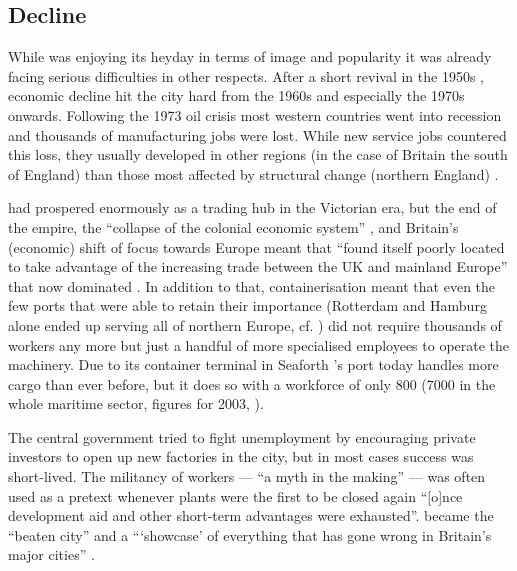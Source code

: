 		\subsection{Decline}\label{sec.hist.20.decline}

While  was enjoying its heyday in terms of image and popularity it was already facing serious difficulties in other respects. After a short revival in the 1950s \citep[cf.][402]{murden2006}, economic decline hit the city hard from the 1960s and especially the 1970s onwards.
Following the 1973 oil crisis most western countries went into recession and thousands of manufacturing jobs were lost.
While new service jobs countered this loss, they usually developed in other regions (in the case of Britain the south of England) than those most affected by structural change (northern England) \citep[cf.][16--17]{juddparkinson1990a}.

 had prospered enormously as a trading hub in the Victorian era, but the end of the empire, the ``collapse of the colonial economic system'' \citep[52]{belchem2006a}, and Britain's (economic) shift of focus towards Europe meant that  ``found itself poorly located to take advantage of the increasing trade between the UK and mainland Europe'' that now dominated \citep[166--167]{couch2003a}.
In addition to that, containerisation meant that even the few ports that were able to retain their importance (Rotterdam and Hamburg alone ended up serving all of northern Europe, cf. \citealt[264]{milne2006}) did not require thousands of workers any more but just a handful of more specialised employees to operate the machinery.
Due to its container terminal in Seaforth 's port today handles more cargo than ever before, but it does so with a workforce of only 800 (7000 in the whole maritime sector, figures for 2003, \citealt[cf.][477]{murden2006}).

The central government tried to fight unemployment by encouraging private investors to open up new factories in the city, but in most cases success was short-lived.
The militancy of  workers --- ``a myth in the making'' --- was often used as a pretext whenever  plants were the first to be closed again ``[o]nce development aid and other short-term advantages were exhausted''\citep[cf.][52]{belchem2006a}.
 became the ``beaten city'' and a ```showcase' of everything that has gone wrong in Britain's major cities'' \citep[\emph{Daily Mirror}, 11 October 1982, cited in][52--53]{belchem2006a}.


